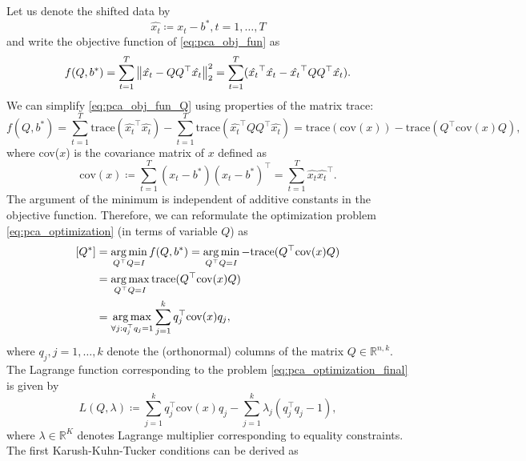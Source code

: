 Let us denote the shifted data by
\begin{equation}
    \hat{x_t} \coloneqq x_t - b^* , t=1, \dots, T
\end{equation}
and write the objective function of \eqref{eq:pca_obj_fun} as
\begin{equation}
    f(Q,b^*) = \sum_{t=1}^T \left\lVert\hat{x_t} - QQ^{\top}\hat{x_t}\right\rVert_2^2 = \sum_{t=1}^T (\hat{x_t}^{\top}\hat{x_t} - \hat{x_t}^{\top} QQ^{\top} \hat{x_t}).
    \label{eq:pca_obj_fun_Q}
\end{equation}
We can simplify \eqref{eq:pca_obj_fun_Q} using properties of the matrix trace:
\begin{equation}
    f(Q,b^*) = \sum_{t=1}^T \text{trace} (\hat{x_t}^{\top}\hat{x_t}) - \sum_{t=1}^T \text{trace} (\hat{x_t}^{\top} QQ^{\top} \hat{x_t})
    = \text{trace}(\text{cov}(x)) - \text{trace}(Q^{\top} \text{cov}(x) Q ),
\end{equation}
where cov($x$) is the covariance matrix of $x$ defined as
\begin{equation}
    \text{cov}(x) \coloneqq \sum_{t=1}^T(x_t-b^*)(x_t-b^*)^{\top} = \sum_{t=1}^T\hat{x_t}\hat{x_t}^{\top}.
\end{equation}
The argument of the minimum is independent of additive constants in the objective function. Therefore, we can reformulate the optimization problem \eqref{eq:pca_optimization} (in terms of variable $Q$) as
\begin{equation}
    \begin{split}
        [Q^*] &= \operatorname*{arg\,min}_{Q^{\top}Q=I} f(Q,b^*) = \operatorname*{arg\,min}_{Q^{\top}Q=I} -\text{trace}(Q^{\top}\text{cov}(x)Q) \\&= \operatorname*{arg\,max}_{Q^{\top}Q=I} \text{trace}(Q^{\top}\text{cov}(x)Q) \\&= \operatorname*{arg\,max}_{\forall j:q_j^{\top}q_j=1} \sum_{j=1}^k q_j^{\top} \text{cov}(x) q_j,
    \end{split}
    \label{eq:pca_optimization_final}
\end{equation}
where $q_j , j=1,\dots,k$ denote the (orthonormal) columns of the matrix $Q \in \mathbb{R}^{n,k}$. The Lagrange function corresponding to the problem \eqref{eq:pca_optimization_final} is given by
\begin{equation}
    L(Q, \lambda) \coloneqq \sum_{j=1}^k q_j^{\top} \text{cov}(x)q_j - \sum_{j=1}^k \lambda_j (q_j^{\top} q_j - 1),
\end{equation}
where $\lambda \in \mathbb{R}^K$ denotes Lagrange multiplier corresponding to equality constraints. The first Karush-Kuhn-Tucker conditions can be derived as
